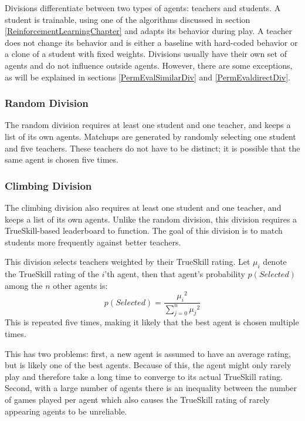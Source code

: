 Divisions differentiate between two types of agents: teachers and students. A student is trainable, using one of the algorithms discussed in section \ref{ReinforcementLearningChapter} and adapts its behavior during play. A teacher does not change its behavior and is either a baseline with hard-coded behavior or a clone of a student with fixed weights. Divisions usually have their own set of agents and do not influence outside agents. However, there are some exceptions, as will be explained in sections \ref{PermEvalSimilarDiv} and \ref{PermEvaldirectDiv}.

\subsubsection{Random Division}
The random division requires at least one student and one teacher, and keeps a list of its own agents. Matchups are generated by randomly selecting one student and five teachers. These teachers do not have to be distinct; it is possible that the same agent is chosen five times.

\subsubsection{Climbing Division}
The climbing division also requires at least one student and one teacher, and keeps a list of its own agents. Unlike the random division, this division requires a TrueSkill-based leaderboard to function. The goal of this division is to match students more frequently against better teachers.

This division selects teachers weighted by their TrueSkill rating. Let $\mu_i$ denote the TrueSkill rating of the $i$'th agent, then that agent's probability $p(Selected)$ among the $n$ other agents is:
\begin{equation}
  p(Selected) = \frac{{\mu_i}^2}{\sum_{j=0}^{n} {\mu_j}^2}
\end{equation}
This is repeated five times, making it likely that the best agent is chosen multiple times.

This has two problems: first, a new agent is assumed to have an average rating, but is likely one of the best agents. Because of this, the agent might only rarely play and therefore take a long time to converge to its actual TrueSkill rating. Second, with a large number of agents there is an inequality between the number of games played per agent which also causes the TrueSkill rating of rarely appearing agents to be unreliable.

